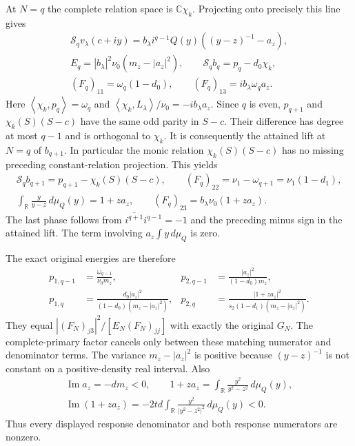 \documentclass[11pt]{article}
\newcommand{\C}{\mathbb C}\newcommand{\R}{\mathbb R}
\newcommand{\ip}[2]{\left\langle#1,#2\right\rangle}
\begin{document}
At $N=q$ the complete relation space is $\C\chi_k$. Projecting
onto precisely this line gives
\begin{equation}\tag{LCS7}
\begin{gathered}
 \mathscr S_qv_\lambda(c+iy)
   =b_\lambda i^{q-1}Q(y)\left((y-z)^{-1}-a_z\right),\\
 E_q=|b_\lambda|^2\nu_0(m_z-|a_z|^2),\qquad
 \mathscr S_qb_q=p_q-d_0\chi_k,\\
 (F_q)_{11}=\omega_q(1-d_0),\qquad
 (F_q)_{13}=i b_\lambda\omega_qa_z.
\end{gathered}
\end{equation}
Here $\ip{\chi_k}{p_q}=\omega_q$ and
$\ip{\chi_k}{L_\lambda}/\nu_0=-i b_\lambda a_z$.
Since $q$ is even, $p_{q+1}$ and $\chi_k(S)(S-c)$ have the same
odd parity in $S-c$. Their difference has degree at most $q-1$
and is orthogonal to $\chi_k$. It is consequently the attained
lift at $N=q$ of $b_{q+1}$. In particular the monic relation
$\chi_k(S)(S-c)$ has no missing preceding constant-relation
projection. This yields
\begin{equation}\tag{LCS8}
\begin{gathered}
 \mathscr S_qb_{q+1}=p_{q+1}-\chi_k(S)(S-c),\qquad
 (F_q)_{22}=\nu_1-\omega_{q+1}=\nu_1(1-d_1),\\
 \int_\R\frac{y}{y-z}\,d\mu_Q(y)=1+za_z,\qquad
 (F_q)_{23}=b_\lambda\nu_0(1+za_z).
\end{gathered}
\end{equation}
The last phase follows from
$\overline{i^{q+1}}i^{q-1}=-1$ and the preceding minus sign in
the attained lift. The term involving $a_z\int y\,d\mu_Q$ is zero.

The exact original energies are therefore
\begin{equation}\tag{LCS9}
\boxed{\begin{aligned}
 p_{1,q-1}&=\frac{\omega_{q-1}}{\nu_0m_z},&
 p_{2,q-1}&=\frac{|a_z|^2}{(1-d_0)m_z},\\
 p_{1,q}&=\frac{d_0|a_z|^2}{(1-d_0)(m_z-|a_z|^2)},&
 p_{2,q}&=\frac{|1+za_z|^2}
 {s_2(1-d_1)(m_z-|a_z|^2)}.
\end{aligned}}
\end{equation}
They equal $|(F_N)_{j3}|^2/[E_N(F_N)_{jj}]$ with exactly the
original $G_N$. The complete-primary factor cancels only between
these matching numerator and denominator terms. The variance
$m_z-|a_z|^2$ is positive because $(y-z)^{-1}$ is not constant
on a positive-density real interval. Also
\begin{equation}\tag{LCS10}
\begin{gathered}
 \operatorname{Im}a_z=-dm_z<0,\qquad
 1+za_z=\int_\R\frac{y^2}{y^2-z^2}\,d\mu_Q(y),\\
 \operatorname{Im}(1+za_z)
       =-2td\int_\R\frac{y^2}{|y^2-z^2|^2}\,d\mu_Q(y)<0.
\end{gathered}
\end{equation}
Thus every displayed response denominator and both response
numerators are nonzero.
\end{document}
